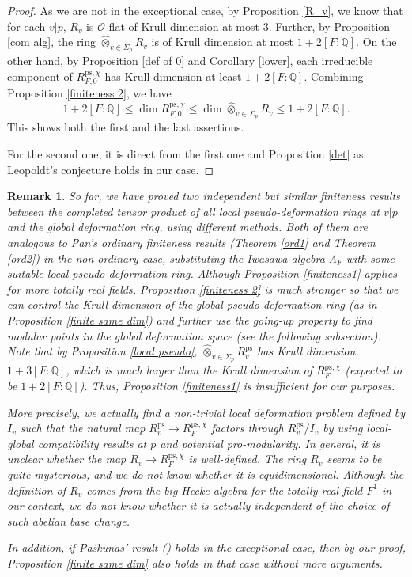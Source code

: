 \documentclass[a4paper, 12pt]{amsart}
\newtheorem{rem}[thm]{\bf Remark}
\def\ps{\mathrm{ps}}
\newcommand{\Q}{\mathbb{Q}}
\newcommand{\cO}{\mathcal{O}}
\begin{document}
    \begin{proof}
    	As we are not in the exceptional case, by Proposition \ref{R_v}, we know that for each $v|p$, $R_v$ is $\cO$-flat of Krull dimension at most $3$. Further, by Proposition \ref{com alg}, the ring $\widehat{\otimes}_{v \in \Sigma_p} R_{v}$ is of Krull dimension at most $1+2[F: \Q]$. On the other hand, by Proposition \ref{def of 0} and Corollary \ref{lower}, each irreducible component of $ R_{F, 0}^{\ps, \chi}$ has Krull dimension at least $1+2[F:\Q]$. Combining Proposition \ref{finiteness 2}, we have $$
    	1+2[F:\Q] \le \dim R_{F, 0}^{\ps, \chi} \le \dim \widehat{\otimes}_{v \in \Sigma_p} R_{v} \le 1+2[F:\Q].$$
    	This shows both the first and the last assertions.
    	
    	For the second one, it is direct from the first one and Proposition \ref{det} as Leopoldt's conjecture holds in our case.
    	
    \end{proof}
    
    \begin{rem}\label{rem on fin}
    	So far, we have proved two independent but similar finiteness results between the completed tensor product of all local pseudo-deformation rings at $v|p$ and the global deformation ring, using different methods.
    	Both of them are analogous to Pan's ordinary finiteness results (Theorem \ref{ord1} and Theorem \ref{ord2}) in the non-ordinary case, substituting the Iwasawa algebra $\Lambda_F$ with some suitable local pseudo-deformation ring. Although Proposition \ref{finiteness1} applies for more totally real fields, Proposition \ref{finiteness 2} is much stronger so that we can control the Krull dimension of the global pseudo-deformation ring (as in Proposition \ref{finite same dim}) and further use the going-up property to find modular points in the global deformation space (see the following subsection). Note that by Proposition \ref{local pseudo}, $\widehat{\otimes}_{v \in \Sigma_p} R_{v}^\ps$ has Krull dimension $1+3[F:\Q]$, which is much larger than the Krull dimension of $R_{F}^{\ps, \chi}$ (expected to be $1+2[F:\Q]$). Thus, Proposition \ref{finiteness1} is insufficient for our purposes.
    	
    	 More precisely, we actually find a non-trivial local deformation problem defined by $I_v$ such that the natural map $R_v^\ps \to R_F^{\ps, \chi} $ factors through $R_v^\ps/I_v$ by using local-global compatibility results at $p$ and potential pro-modularity. In general, it is unclear whether the map $R_v \to R_F^{\ps, \chi} $ is well-defined. The ring $R_v$ seems to be quite mysterious, and we do not know whether it is equidimensional. Although the definition of $R_v$ comes from the big Hecke algebra for the totally real field $F^1$ in our context, we do not know whether it is actually independent of the choice of such abelian base change.
    	 
    	 In addition, if Pašk\=unas' result (\cite[Corollary 5.13]{Paskunas_2021}) holds in the exceptional case, then by our proof, Proposition \ref{finite same dim} also holds in that case without more arguments.
    	 \end{rem}
    
\end{document}

